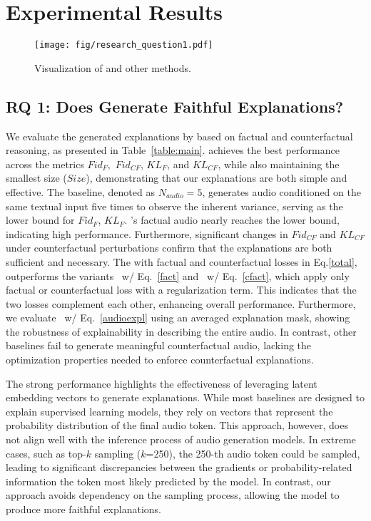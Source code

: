 \section{Experimental Results}

\begin{figure}
    \center
    \texttt{[image: fig/research\_question1.pdf]}
    \caption{Visualization of \mname{} and other methods.}
    \label{experiment}
\end{figure}

\subsection{RQ 1: Does \mname{} Generate Faithful Explanations?}

We evaluate the generated explanations by \mname{} based on factual and counterfactual reasoning, as presented in Table~\ref{table:main}. \mname{} achieves the best performance across the metrics $Fid_{F},$ $Fid_{CF}$, $KL_{F}$, and $KL_{CF}$, while also maintaining the smallest size ($Size$), demonstrating that our explanations are both simple and effective. The baseline, denoted as $N_{audio}=5$, generates audio conditioned on the same textual input five times to observe the inherent variance, serving as the lower bound for $Fid_{F}$, $KL_{F}$. \mname{}'s factual audio nearly reaches the lower bound, indicating high performance. Furthermore, significant changes in $Fid_{CF}$ and $KL_{CF}$ under counterfactual perturbations confirm that the explanations are both sufficient and necessary. The \mname{} with factual and counterfactual losses in Eq.\eqref{total}, outperforms the variants \mname \ w/ Eq.~\eqref{fact} and \mname \ w/ Eq.~\eqref{cfact}, which apply only factual or counterfactual loss with a regularization term. This indicates that the two losses complement each other, enhancing overall performance. Furthermore, we evaluate \mname \ w/ Eq.~\eqref{audioexpl} using an averaged explanation mask, showing the robustness of explainability in describing the entire audio. In contrast, other baselines fail to generate meaningful counterfactual audio, lacking the optimization properties needed to enforce counterfactual explanations. 

The strong performance highlights the effectiveness of leveraging latent embedding vectors to generate explanations. While most baselines are designed to explain supervised learning models, they rely on vectors that represent the probability distribution of the final audio token. This approach, however, does not align well with the inference process of audio generation models. In extreme cases, such as top-$k$ sampling ($k$=250), the 250-th audio token could be sampled, leading to significant discrepancies between the gradients or probability-related information the token most likely predicted by the model. In contrast, our approach avoids dependency on the sampling process, allowing the model to produce more faithful explanations.

